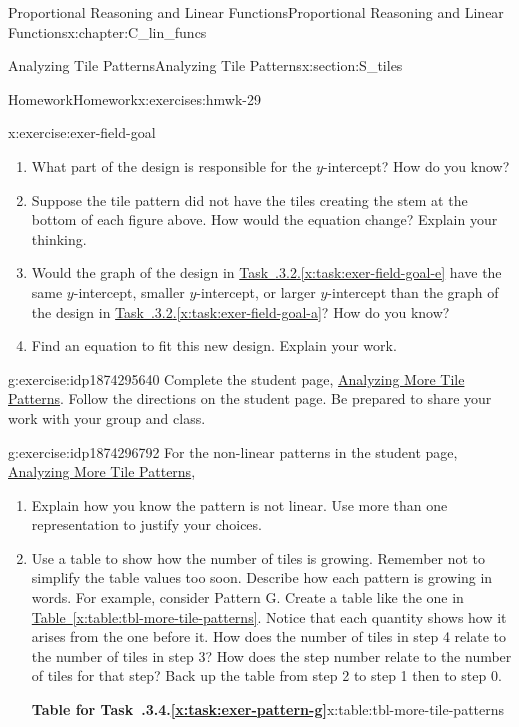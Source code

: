 \documentclass[oneside,10pt,]{book}
\newcommand{\xreffont}{\relax}
\numberwithin{equation}{chapter}
\begin{document}
\begin{chapterptx}{Proportional Reasoning and Linear Functions}{}{Proportional Reasoning and Linear Functions}{}{}{x:chapter:C_lin_funcs}
\begin{sectionptx}{Analyzing Tile Patterns}{}{Analyzing Tile Patterns}{}{}{x:section:S_tiles}
\begin{exercises-subsection}{Homework}{}{Homework}{}{}{x:exercises:hmwk-29}
\begin{divisionexercise}{2}{}{}{x:exercise:exer-field-goal}
\begin{enumerate}[font=\bfseries,label=(\alph*),ref=\alph*]
\item{}What part of the design is responsible for the \(y\)-intercept? How do you know?%
\item\label{x:task:exer-field-goal-e}Suppose the tile pattern did not have the tiles creating the stem at the bottom of each figure above. How would the equation change? Explain your thinking.%
\item{}Would the graph of the design in \hyperref[x:task:exer-field-goal-e]{Task~{\xreffont 2.9.3.2}.{\xreffont\ref{x:task:exer-field-goal-e}}} have the same \(y\)-intercept, smaller \(y\)-intercept, or larger \(y\)-intercept than the graph of the design in \hyperref[x:task:exer-field-goal-a]{Task~{\xreffont 2.9.3.2}.{\xreffont\ref{x:task:exer-field-goal-a}}}? How do you know?%
\item{}Find an equation to fit this new design. Explain your work.%
\end{enumerate}
\end{divisionexercise}%
\begin{divisionexercise}{3}{}{}{g:exercise:idp1874295640}%
Complete the student page, \hyperref[x:worksheet:act-analyze-more-tiles]{Analyzing More Tile Patterns}. Follow the directions on the student page. Be prepared to share your work with your group and class.%
\end{divisionexercise}%
\begin{divisionexercise}{4}{}{}{g:exercise:idp1874296792}%
For the non-linear patterns in the student page, \hyperref[x:worksheet:act-analyze-more-tiles]{Analyzing More Tile Patterns},%
\begin{enumerate}[font=\bfseries,label=(\alph*),ref=\alph*]
\item{}Explain how you know the pattern is not linear. Use more than one representation to justify your choices.%
\item\label{x:task:exer-pattern-g}Use a table to show how the number of tiles is growing. Remember not to simplify the table values too soon. Describe how each pattern is growing in words. For example, consider Pattern G. Create a table like the one in \hyperref[x:table:tbl-more-tile-patterns]{Table~{\xreffont\ref{x:table:tbl-more-tile-patterns}}}. Notice that each quantity shows how it arises from the one before it. How does the number of tiles in step 4 relate to the number of tiles in step 3? How does the step number relate to the number of tiles for that step?  Back up the table from step 2 to step 1 then to step 0.%
\begin{tableptx}{\textbf{Table for Task~{\xreffont 2.9.3.4}.{\xreffont\ref*{x:task:exer-pattern-g}}}}{x:table:tbl-more-tile-patterns}{}%

\end{tableptx}
\end{enumerate}
\end{divisionexercise}
\end{exercises-subsection}
\end{sectionptx}
\end{chapterptx}
\end{document}
